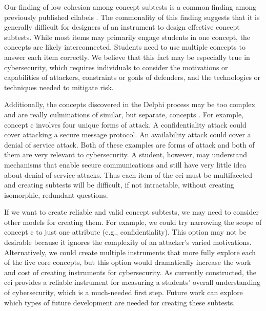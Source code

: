 Our finding of low cohesion among concept subtests is a common finding among previously published \glspl{cilabel} \cite{jorian}. The commonality of this finding suggests that it is generally difficult for designers of an instrument to design effective concept subtests. While most items may primarily engage students in one concept, the concepts are likely interconnected. Students need to use multiple concepts to answer each item correctly. We believe that this fact may be especially true in cybersecurity, which requires individuals to consider the motivations or capabilities of attackers, constraints or goals of defenders, and the technologies or techniques needed to mitigate risk.

Additionally, the concepts discovered in the Delphi process may be too complex and are really culminations of similar, but separate, concepts \cite{delphi}. For example, concept \gls{c} involves four unique forms of attack. A confidentiality attack could cover attacking a secure message protocol. An availability attack could cover a denial of service attack. Both of these examples are forms of attack and both of them are very relevant to cybersecurity. A student, however, may understand mechanisms that enable secure communications and still have very little idea about denial-of-service attacks. Thus each item of the \gls{cci} must be multifaceted and creating subtests will be difficult, if not intractable, without creating isomorphic, redundant questions.



If we want to create reliable and valid concept subtests, we may need to consider other models for creating them. For example, we could try narrowing the scope of concept \gls{c} to just one attribute (e.g., confidentiality). This option may not be desirable because it ignores the complexity of an attacker's varied motivations. Alternatively, we could create multiple instruments that more fully explore each of the five core concepts, but this option would dramatically increase the work and cost of creating instruments for cybersecurity. As currently constructed, the \gls{cci} provides a reliable instrument for measuring a students' overall understanding of cybersecurity, which is a much-needed first step. Future work can explore which types of future development are needed for creating these subtests.

